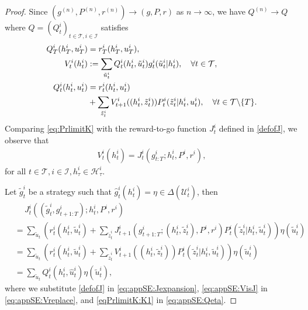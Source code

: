 \documentclass[pdflatex,sn-basic]{sn-jnl}
\newcommand{\es}{\enspace\enspace\:}
\newcommand{\Qfunc}{Q}
\theoremstyle{thmstyleone}%
\theoremstyle{thmstyletwo}%
\theoremstyle{thmstylethree}%
\begin{document}
\begin{appendices}
\begin{proof}
		Since $(g^{(n)}, P^{(n)}, r^{(n)}) \rightarrow (g, P, r)$ as $n\rightarrow\infty$, we have $\Qfunc^{(n)} \rightarrow \Qfunc$ where $\Qfunc=(\Qfunc_t^i)_{t\in\mathcal{T}, i\in\mathcal{I}}$ satisfies
		\begin{subequations}\label{eq:PrlimitK}
		\begin{align}
			\Qfunc_T^{i}(h_T^i, u_T^i) &= r_T^{i}(h_T^i, u_T^i),\label{eqPrlimitK:K}\\
			V_t^{i}(h_t^i) &:= \sum_{\tilde{u}_t^i} \Qfunc_t^{i}(h_t^i, \tilde{u}_t^i)g_t^{i}(\tilde{u}_t^i|h_t^i),\quad \forall t\in\mathcal{T},\label{eqPrlimitK:V}\\
			\Qfunc_{t}^{i}(h_t^i, u_t^i) &= r_t^{i}(h_t^i, u_t^i) \notag \\
			&+ \sum_{\tilde{z}_{t}^i} V_{t+1}^{i}((h_t^i, \tilde{z}_{t}^i)) P_t^{i}(\tilde{z}_{t}^i|h_t^i, u_t^i),\quad \forall t\in\mathcal{T}\backslash\{T\}. \label{eqPrlimitK:K1}
		\end{align}
		\end{subequations}
		 Comparing \eqref{eq:PrlimitK} with {the reward-to-go function $J_t^i$ defined in \eqref{defofJ}, we observe that}
        \begin{align}
			V_t^{i}(h_t^i) = J_t^i(g_{t:T}^i; h_t^i, P^i, r^i)\label{eq:appSE:VisJ},
		\end{align}
		for all $t\in \mathcal{T}, i\in\mathcal{I}, h_\tau^i \in\mathcal{H}_\tau^i$.
	
		Let $\tilde{g}_t^i$ be a strategy such that $\hat{g}_t^i(h_t^i) = \eta \in\Delta(\mathcal{U}_t^i)$, then 
		\begin{align}
			&\es J_t^i((\tilde{g}_{t}^i, g_{t+1:T}^i); h_t^i, P^i, r^i)\\
			&= \sum_{\tilde{u}_t}\left( r_t^{i}(h_t^i, \tilde{u}_t^i) + \sum_{\tilde{z}_{t}^i} J_{t+1}^i(g_{t+1:T}^i; (h_t^i, \tilde{z}_t^i), P^i, r^i) P_t^i(\tilde{z}_t^i|h_t^i, \tilde{u}_t^i)\right)\eta(\tilde{u}_t^i)\label{eq:appSE:Jexpansion} \\
			&= \sum_{\tilde{u}_t}\left(r_t^{i}(h_t^i, \tilde{u}_t^i) + \sum_{\tilde{z}_{t}^i} V_{t+1}^i((h_t^i, \tilde{z}_t^i)) P_t^i(\tilde{z}_t^i|h_t^i, \tilde{u}_t^i)\right)\eta(\tilde{u}_t^i)\label{eq:appSE:Vreplace} \\
			&= \sum_{\tilde{u}_t}\Qfunc_{t}^{i}(h_t^i, \hat{u}_t^i) \eta(\tilde{u}_t^i),\label{eq:appSE:Qeta}
		\end{align}
        {where we substitute \eqref{defofJ} in \eqref{eq:appSE:Jexpansion}, \eqref{eq:appSE:VisJ} in \eqref{eq:appSE:Vreplace}, and \eqref{eqPrlimitK:K1} in \eqref{eq:appSE:Qeta}.}
	

\end{proof}
\end{appendices}
\end{document}
